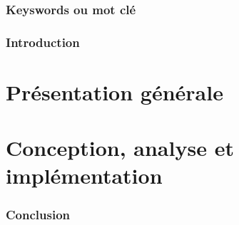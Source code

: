 \documentclass[12pt,a4paper]{report}
\begin{document}
\pagebreak


\begin{abstract}
	\lipsum[2]
\end{abstract}
\begin{abstract}
	\lipsum[2]
\end{abstract}


\section*{Keyswords ou mot clé}


\newpage
\listoftables
\newpage
\listoffigures

\newpage 	
{}		
\pagestyle{fancy}


\newpage
\section*{Introduction}
\newpage

\part{Présentation générale}







\part{Conception, analyse  et implémentation}



%



\newpage
{}
\section*{Conclusion}


\pagebreak



			
\end{document}
